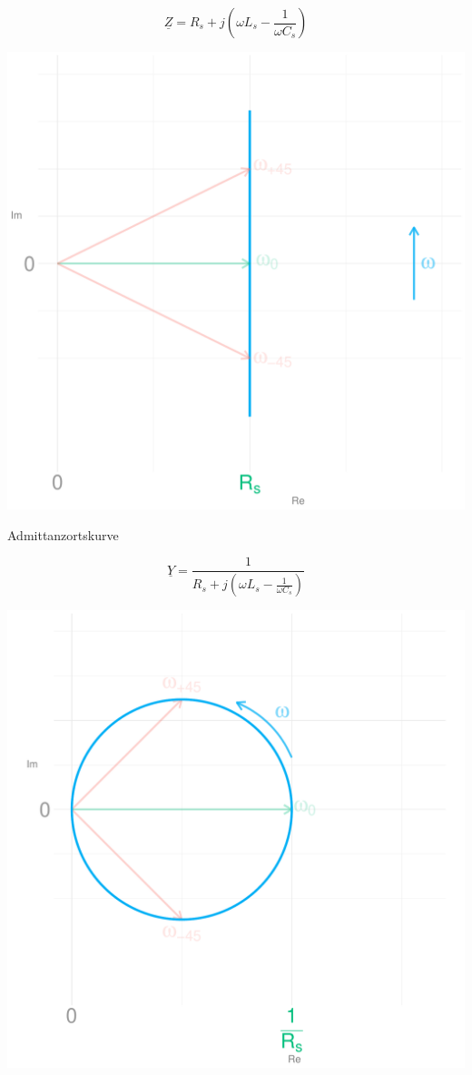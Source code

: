 \documentclass[a4paper, 12pt]{article}
\begin{document}
    $$\underline{Z} = R_s + j(\omega L_s - \frac{1}{\omega C_s})$$

    \begin{center}
      \includegraphics[scale=0.3819660112501051]{./R/2_3/SSK_Impedanz.pdf}
    \end{center}

    \begin{center}
      \large Admittanzortskurve
    \end{center}

    $$\underline{Y} = \frac{1}{R_s + j(\omega L_s - \frac{1}{\omega C_s})}$$

    \begin{center}
      \includegraphics[scale=0.3819660112501051]{./R/2_3/SSK_Admittanz.pdf}
    \end{center}
\end{document}
